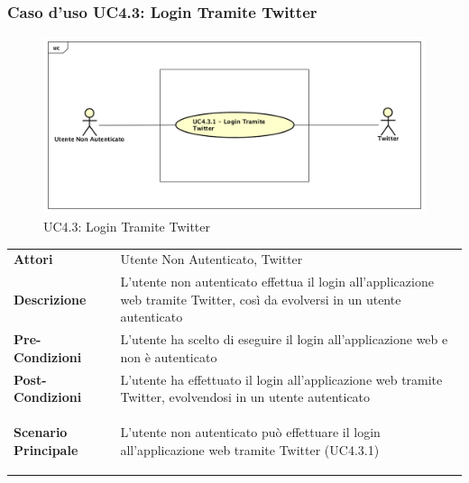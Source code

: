 \newpage
\subsubsection{Caso d'uso UC4.3: Login Tramite Twitter }
\label{UC4_3}
\begin{figure}[ht]
	\centering
	\includegraphics[scale=0.45]{UML/UC4_3.png}
	\caption{UC4.3: Login Tramite Twitter}
\end{figure}

\begin{longtable}{ l | p{11cm}}
	\hline
	\rowcolor{Gray}
	 \multicolumn{2}{c}{UC4.3 - Login Tramite Twitter} \\
	 \hline
	\textbf{Attori} & Utente Non Autenticato, Twitter \\
	\textbf{Descrizione} & L'utente non autenticato effettua il login all'applicazione web tramite Twitter, così da evolversi in un utente autenticato\\
	\textbf{Pre-Condizioni} & L'utente ha scelto di eseguire il login all'applicazione web e non è autenticato \\
	\textbf{Post-Condizioni} & L'utente ha effettuato il login all'applicazione web tramite Twitter, evolvendosi in un utente autenticato \\
	\textbf{Scenario Principale} & \begin{enumerate*}[label=(\arabic*.),itemjoin={\newline}]
		\item L'utente non autenticato può effettuare il login all'applicazione web tramite Twitter (UC4.3.1)
	\end{enumerate*}\\
\end{longtable}